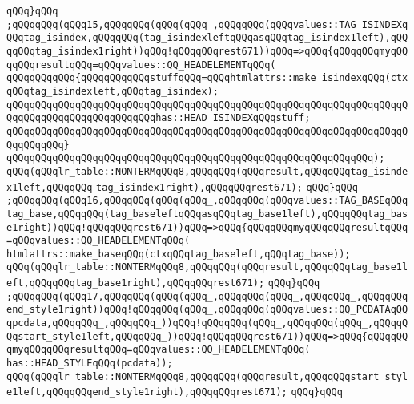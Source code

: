 \verb|qQQq}qQQq|\newline
\verb|;qQQqqQQq(qQQq15,qQQqqQQq(qQQq(qQQq_,qQQqqQQq(qQQqvalues::TAG_ISINDEXqQQqtag_isindex,qQQqqQQq(tag_isindexleftqQQqasqQQqtag_isindex1left),qQQqqQQqtag_isindex1right))qQQq!qQQqqQQqrest671))qQQq=>qQQq{qQQqqQQqmyqQQqqQQqresultqQQq=qQQqvalues::QQ_HEADELEMENTqQQq(|\newline
\verb|qQQqqQQqqQQq{qQQqqQQqqQQqstuffqQQq=qQQqhtmlattrs::make_isindexqQQq(ctxqQQqtag_isindexleft,qQQqtag_isindex);|\newline
\verb|qQQqqQQqqQQqqQQqqQQqqQQqqQQqqQQqqQQqqQQqqQQqqQQqqQQqqQQqqQQqqQQqqQQqqQQqqQQqqQQqqQQqqQQqqQQqqQQqhas::HEAD_ISINDEXqQQqstuff;|\newline
\verb|qQQqqQQqqQQqqQQqqQQqqQQqqQQqqQQqqQQqqQQqqQQqqQQqqQQqqQQqqQQqqQQqqQQqqQQqqQQqqQQq}|\newline
\verb|qQQqqQQqqQQqqQQqqQQqqQQqqQQqqQQqqQQqqQQqqQQqqQQqqQQqqQQqqQQqqQQq);|\newline
\verb|qQQq(qQQqlr_table::NONTERMqQQq8,qQQqqQQq(qQQqresult,qQQqqQQqtag_isindex1left,qQQqqQQq|\newline
\verb|tag_isindex1right),qQQqqQQqrest671);|\newline
\verb|qQQq}qQQq|\newline
\verb|;qQQqqQQq(qQQq16,qQQqqQQq(qQQq(qQQq_,qQQqqQQq(qQQqvalues::TAG_BASEqQQqtag_base,qQQqqQQq(tag_baseleftqQQqasqQQqtag_base1left),qQQqqQQqtag_base1right))qQQq!qQQqqQQqrest671))qQQq=>qQQq{qQQqqQQqmyqQQqqQQqresultqQQq=qQQqvalues::QQ_HEADELEMENTqQQq(|\newline
\verb|htmlattrs::make_baseqQQq(ctxqQQqtag_baseleft,qQQqtag_base));|\newline
\verb|qQQq(qQQqlr_table::NONTERMqQQq8,qQQqqQQq(qQQqresult,qQQqqQQqtag_base1left,qQQqqQQqtag_base1right),qQQqqQQqrest671);|\newline
\verb|qQQq}qQQq|\newline
\verb|;qQQqqQQq(qQQq17,qQQqqQQq(qQQq(qQQq_,qQQqqQQq(qQQq_,qQQqqQQq_,qQQqqQQqend_style1right))qQQq!qQQqqQQq(qQQq_,qQQqqQQq(qQQqvalues::QQ_PCDATAqQQqpcdata,qQQqqQQq_,qQQqqQQq_))qQQq!qQQqqQQq(qQQq_,qQQqqQQq(qQQq_,qQQqqQQqstart_style1left,qQQqqQQq_))qQQq!qQQqqQQqrest671))qQQq=>qQQq{qQQqqQQqmyqQQqqQQqresultqQQq=qQQqvalues::QQ_HEADELEMENTqQQq(|\newline
\verb|has::HEAD_STYLEqQQq(pcdata));|\newline
\verb|qQQq(qQQqlr_table::NONTERMqQQq8,qQQqqQQq(qQQqresult,qQQqqQQqstart_style1left,qQQqqQQqend_style1right),qQQqqQQqrest671);|\newline
\verb|qQQq}qQQq|\newline
